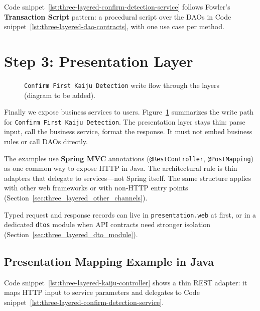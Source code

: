 Code snippet~\ref{lst:three-layered-confirm-detection-service} follows Fowler's \textbf{Transaction Script} pattern: a procedural script over the DAOs in Code snippet~\ref{lst:three-layered-dao-contracts}, with one use case per method.\autocite{fowler2002patterns} 

\section{Step 3: Presentation Layer}
\label{sec:three_layered_step3}

\begin{figure}[htbp]
\centering
{}
\caption{\texttt{Confirm First Kaiju Detection} write flow through the layers (diagram to be added).}
\label{fig:three_layered_confirm_write_flow}
\end{figure}

Finally we expose business services to users. Figure~\ref{fig:three_layered_confirm_write_flow} summarizes the write path for \texttt{Confirm First Kaiju Detection}. The presentation layer stays thin: parse input, call the business service, format the response. It must not embed business rules or call DAOs directly.

The examples use \textbf{Spring MVC} annotations (\texttt{@RestController}, \texttt{@PostMapping}) as one common way to expose HTTP in Java. The architectural rule is thin adapters that delegate to services---not Spring itself. The same structure applies with other web frameworks or with non-HTTP entry points (Section~\ref{sec:three_layered_other_channels}).

Typed request and response records can live in \texttt{presentation.web} at first, or in a dedicated \texttt{dtos} module when API contracts need stronger isolation (Section~\ref{sec:three_layered_dto_module}).

\subsection{Presentation Mapping Example in Java}
\label{sec:three_layered_presentation_mapping_java}

Code snippet~\ref{lst:three-layered-kaiju-controller} shows a thin REST adapter: it maps HTTP input to service parameters and delegates to Code snippet~\ref{lst:three-layered-confirm-detection-service}.

